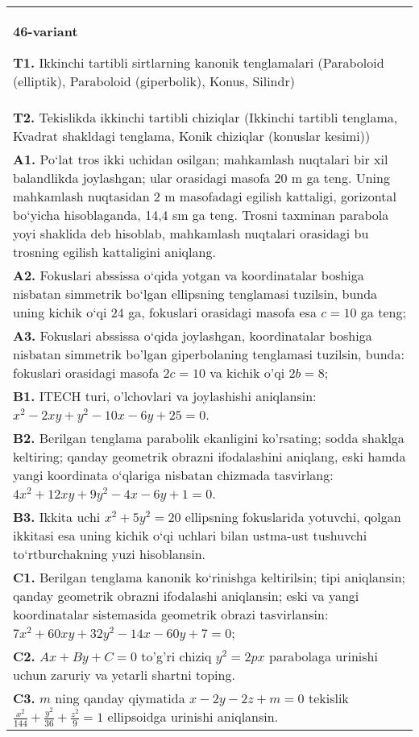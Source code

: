 \documentclass{article}
\begin{document}
\begin{tabular}{m{17cm}}
\textbf{46-variant}
\newline

\textbf{T1.} Ikkinchi tartibli sirtlarning kanonik tenglamalari (Paraboloid (elliptik), Paraboloid (giperbolik), Konus, Silindr) \\
\textbf{T2.} Tekislikda ikkinchi tartibli chiziqlar (Ikkinchi tartibli tenglama, Kvadrat shakldagi tenglama, Konik chiziqlar (konuslar kesimi)) \\
\textbf{A1.} Po‘lat tros ikki uchidan osilgan; mahkamlash nuqtalari bir xil balandlikda joylashgan; ular orasidagi masofa 20 m ga teng. Uning mahkamlash nuqtasidan 2 m masofadagi egilish kattaligi, gorizontal bo‘yicha hisoblaganda, 14,4 sm ga teng. Trosni taxminan parabola yoyi shaklida deb hisoblab, mahkamlash nuqtalari orasidagi bu trosning egilish kattaligini aniqlang. \\
\textbf{A2.} Fokuslari abssissa o‘qida yotgan va koordinatalar boshiga nisbatan simmetrik bo‘lgan ellipsning tenglamasi tuzilsin, bunda uning kichik o‘qi 24 ga, fokuslari orasidagi masofa esa $c = 10$ ga teng; \\
\textbf{A3.} Fokuslari abssissa o‘qida joylashgan, koordinatalar boshiga nisbatan simmetrik bo'lgan giperbolaning tenglamasi tuzilsin, bunda: fokuslari orasidagi masofa $2 c=10$ va kichik o'qi $2 b=8$; \\
\textbf{B1.} ITECH turi, o'lchovlari va joylashishi aniqlansin: $x^2-2 x y+y^2-10 x-6 y+25=0$. \\
\textbf{B2.} Berilgan tenglama parabolik ekanligini ko'rsating; sodda shaklga keltiring; qanday geometrik obrazni ifodalashini aniqlang, eski hamda yangi koordinata o‘qlariga nisbatan chizmada tasvirlang: $4 x^2+12 x y+9 y^2-4 x-6 y+1=0$. \\
\textbf{B3.} Ikkita uchi $x^2+5 y^2=20$ ellipsning fokuslarida yotuvchi, qolgan ikkitasi esa uning kichik o‘qi uchlari bilan ustma-ust tushuvchi to‘rtburchakning yuzi hisoblansin. \\
\textbf{C1.} Berilgan tenglama kanonik ko‘rinishga keltirilsin; tipi aniqlansin; qanday geometrik obrazni ifodalashi aniqlansin; eski va yangi koordinatalar sistemasida geometrik obrazi tasvirlansin: $7 x^2+60 x y+32 y^2-14 x-60 y+7=0$; \\
\textbf{C2.} $A x+B y+C=0$ to'g'ri chiziq $y^2=2 p x$ parabolaga urinishi uchun zaruriy va yetarli shartni toping. \\
\textbf{C3.} $m$ ning qanday qiymatida $x-2 y-2 z+m=0$ tekislik $\frac{x^2}{144}+\frac{y^2}{36}+\frac{z^2}{9}=1$ ellipsoidga urinishi aniqlansin. \\

\end{tabular}
\vspace{1cm}
\end{document}
